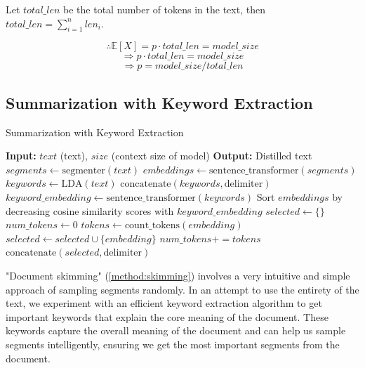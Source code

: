 Let $total\_len$ be the total number of tokens in the text, then $total\_len = \sum_{i = 1}^{n} len_i$.

\[ \therefore \mathbb{E}[X] = p \cdot total\_len = model\_size \]
\[ \Rightarrow p \cdot total\_len = model\_size \]
\[ \Rightarrow p = model\_size / total\_len \]


\subsection{Summarization with Keyword Extraction}
\label{method:keyword}

\begin{algorithm*}
  \caption{Summarization with Keyword Extraction}

  \begin{algorithmic}
    \State \textbf{Input:} $text$ (text), $size$ (context size of model)
    \State \textbf{Output:} Distilled text
    \State $segments \leftarrow \text{segmenter}(text)$
    \State $embeddings \leftarrow \text{sentence\_transformer}(segments)$
    \State $keywords \leftarrow \text{LDA}(text)$
    \State $\text{concatenate}(keywords, \text{delimiter})$
    \State $keyword\_embedding \leftarrow \text{sentence\_transformer}(keywords)$
    \State Sort $embeddings$ by decreasing cosine similarity scores with $keyword\_embedding$
    \State $selected \leftarrow \{\}$
    \State $num\_tokens \leftarrow 0$
      \State $tokens \leftarrow \text{count\_tokens}(embedding)$
        \State $selected \leftarrow selected \cup \{embedding\}$
        \State $num\_tokens += tokens$
      \EndIf
    \EndFor
    \State $\text{concatenate}(selected, \text{delimiter})$
    \State {}
  \end{algorithmic}

  \label{algo:keyword}
\end{algorithm*}

"Document skimming" (\autoref{method:skimming}) involves a very intuitive and simple approach of sampling segments randomly.
In an attempt to use the entirety of the text, we experiment with an efficient keyword extraction algorithm to get important keywords that explain the core meaning of the document.
These keywords capture the overall meaning of the document and can help us sample segments intelligently, ensuring we get the most important segments from the document.

